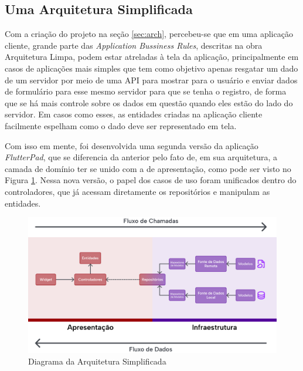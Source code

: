 \documentclass[12pt, %
openright, 
oneside, %
a4paper,    %
brazil]{facom-ufu-abntex2}
\begin{document}
\subsection{Uma Arquitetura Simplificada} \label{subsec:simplified_arch}

Com a criação do projeto na seção \ref{sec:arch}, percebeu-se que em uma aplicação cliente, grande parte das \textit{Application Bussiness Rules}, descritas na obra Arquitetura Limpa, podem estar atreladas à tela da aplicação, principalmente em casos de aplicações mais simples que tem como objetivo apenas resgatar um dado de um servidor por meio de uma API para mostrar para o usuário e enviar dados de formulário para esse mesmo servidor para que se tenha o registro, de forma que se há mais controle sobre os dados em questão quando eles estão do lado do servidor. Em casos como esses, as entidades criadas na aplicação cliente facilmente espelham como o dado deve ser representado em tela.

Com isso em mente, foi desenvolvida uma segunda versão da aplicação \textit{FlutterPad}, que se diferencia da anterior pelo fato de, em sua arquitetura, a camada de domínio ter se unido com a de apresentação, como pode ser visto no Figura \ref{fig:arch_simplified_diagram}. Nessa nova versão, o papel dos casos de uso foram unificados dentro do controladores, que já acessam diretamente os repositórios e manipulam as entidades.

\begin{figure}[ht]
    \centering
    \includegraphics[width=1\textwidth]{figures/arch/arch_simplified_diagram.png}
    \caption{Diagrama da Arquitetura Simplificada}
    \label{fig:arch_simplified_diagram}
\end{figure}
\end{document}
